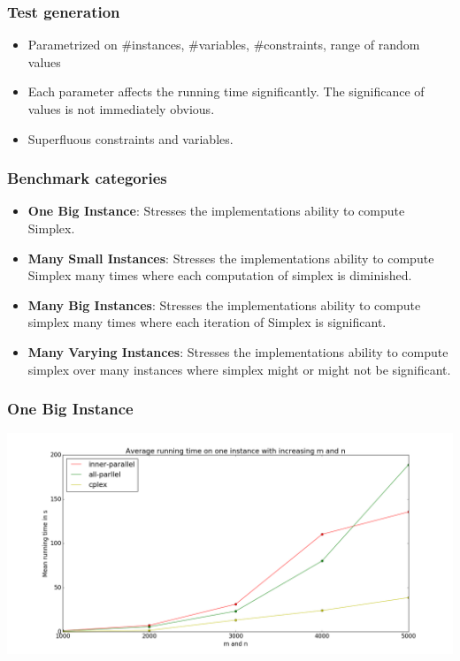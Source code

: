 \documentclass[handout]{beamer}
\begin{document}

\begin{frame}
	\frametitle{Test generation}
	\begin{itemize}
		\item Parametrized on \#instances, \#variables, \#constraints, range of random values
		
		\item Each parameter affects the running time significantly. The significance of values is not immediately obvious.
		
		\item Superfluous constraints and variables.
	\end{itemize}
\end{frame}

\begin{frame}
\frametitle{Benchmark categories}
\begin{itemize}
	\item \textbf{One Big Instance}: Stresses the implementations ability to compute Simplex.
	
	\item \textbf{Many Small Instances}: Stresses the implementations ability to compute Simplex many times where each computation of simplex is diminished.
	
	\item \textbf{Many Big Instances}: Stresses the implementations ability to compute simplex many times where each iteration of Simplex is significant. 
	
	\item \textbf{Many Varying Instances}: Stresses the implementations ability to compute simplex over many instances where simplex might or might not be significant. 
\end{itemize}
\end{frame}

\begin{frame}[fragile]
\frametitle{One Big Instance}
\includegraphics[width=\textwidth]{../Doc/figures/one-big}
\end{frame}
\end{document}
